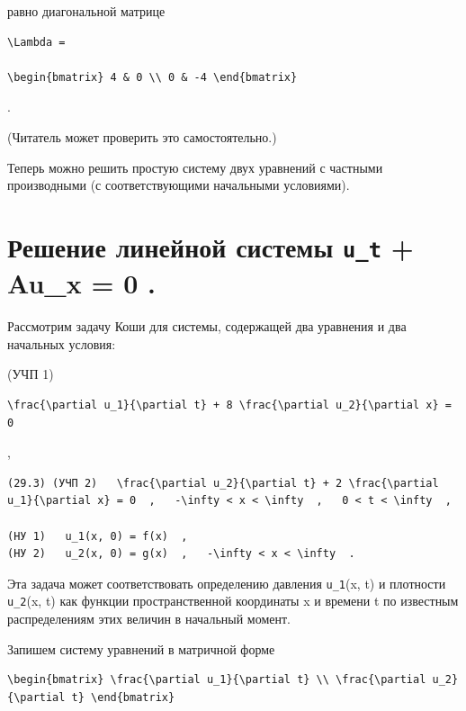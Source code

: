 \documentclass[
  ukrainian,
]{article}
\begin{document}
равно диагональной матрице

\begin{verbatim}
\Lambda =

\begin{bmatrix} 4 & 0 \\ 0 & -4 \end{bmatrix}
\end{verbatim}

.

(Читатель может проверить это самостоятельно.)

Теперь можно решить простую систему двух уравнений с частными
производными (с соответствующими начальными условиями).

\section{\texorpdfstring{Решение линейной системы \texttt{u\_t} + Au\_x
= 0
.}{Решение линейной системы u\_t + Au\_x = 0 .}}\label{ux440ux435ux448ux435ux43dux438ux435-ux43bux438ux43dux435ux439ux43dux43eux439-ux441ux438ux441ux442ux435ux43cux44b-u_t-au_x-0-.}

Рассмотрим задачу Коши для системы, содержащей два уравнения и два
начальных условия:

(УЧП 1)

\begin{verbatim}
\frac{\partial u_1}{\partial t} + 8 \frac{\partial u_2}{\partial x} = 0
\end{verbatim}

,

\begin{verbatim}
(29.3) (УЧП 2)   \frac{\partial u_2}{\partial t} + 2 \frac{\partial u_1}{\partial x} = 0  ,   -\infty < x < \infty  ,   0 < t < \infty  ,

(HУ 1)   u_1(x, 0) = f(x)  ,
(HУ 2)   u_2(x, 0) = g(x)  ,   -\infty < x < \infty  .
\end{verbatim}

Эта задача может соответствовать определению давления \texttt{u\_1}(x,
t) и плотности \texttt{u\_2}(x, t) как функции пространственной
координаты x и времени t по известным распределениям этих величин в
начальный момент.

Запишем систему уравнений в матричной форме

\begin{verbatim}
\begin{bmatrix} \frac{\partial u_1}{\partial t} \\ \frac{\partial u_2}{\partial t} \end{bmatrix}
\end{verbatim}
\end{document}
